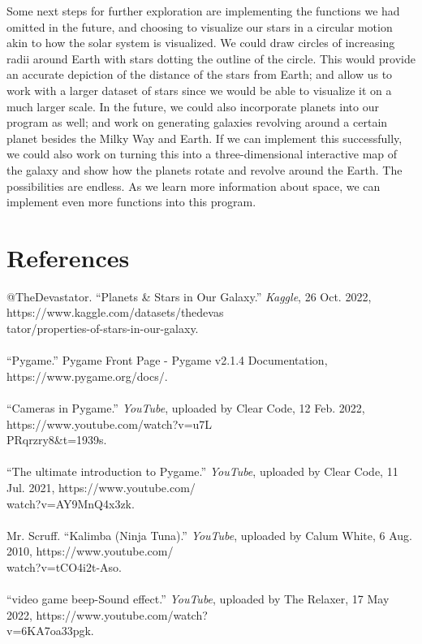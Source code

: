 \documentclass[fontsize=11pt]{article}
\begin{document}
Some next steps for further exploration are implementing the functions we had omitted in the future, and choosing to visualize our stars in a circular motion akin to how the solar system is visualized. We could draw circles of increasing radii around Earth with stars dotting the outline of the circle. This would provide an accurate depiction of the distance of the stars from Earth; and allow us to work with a larger dataset of stars since we would be able to visualize it on a much larger scale. In the future, we could also incorporate planets into our program as well; and work on generating galaxies revolving around a certain planet besides the Milky Way and Earth. If we can implement this successfully, we could also work on turning this into a three-dimensional interactive map of the galaxy and show how the planets rotate and revolve around the Earth. The possibilities are endless. As we learn more information about space, we can implement even more functions into this program.


\section*{References}
@TheDevastator. “Planets \& Stars in Our Galaxy.” \emph{Kaggle}, 26 Oct. 2022, https://www.kaggle.com/datasets/thedevas\\tator/properties-of-stars-in-our-galaxy.\\\\ 
“Pygame.” Pygame Front Page - Pygame v2.1.4 Documentation, https://www.pygame.org/docs/.\\\\
“Cameras in Pygame.” \emph{YouTube}, uploaded by Clear Code, 12 Feb. 2022, https://www.youtube.com/watch?v=u7L\\PRqrzry8&t=1939s.\\\\
“The ultimate introduction to Pygame.” \emph{YouTube}, uploaded by Clear Code, 11 Jul. 2021, https://www.youtube.com/\\watch?v=AY9MnQ4x3zk.\\\\
Mr. Scruff. “Kalimba (Ninja Tuna).” \emph{YouTube}, uploaded by Calum White, 6 Aug. 2010, https://www.youtube.com/\\watch?v=tCO4i2t-Aso.\\\\
“video game beep-Sound effect.” \emph{YouTube}, uploaded by The Relaxer, 17 May 2022, https://www.youtube.com/watch?\\v=6KA7oa33pgk.



\end{document}

